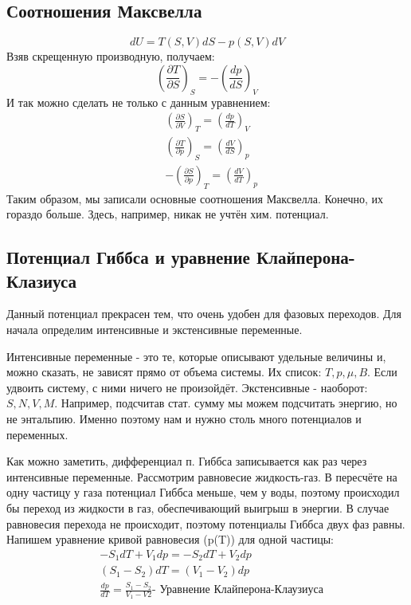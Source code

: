\documentclass[a4paper, 12pt]{article}
\begin{document}
	\subsection{Соотношения Максвелла}
	\begin{equation*}
		dU = T(S,V)dS - p(S,V)dV
	\end{equation*}
	Взяв скрещенную производную, получаем:
	\begin{equation*}
		(\frac{\partial T}{\partial S})_{S} = -(\frac{dp}{dS})_{V}
	\end{equation*}
	И так можно сделать не только с данным уравнением:
	\begin{equation*}
		\begin{aligned}
			& (\frac{\partial S}{\partial V})_{T} = (\frac{dp}{dT})_{V}  \\
			& (\frac{\partial T}{\partial p})_{S} = (\frac{dV}{dS})_{p}  \\
			& -(\frac{\partial S}{\partial p})_{T} = (\frac{dV}{dT})_{p} 
		\end{aligned}
	\end{equation*}
	Таким образом, мы записали основные соотношения Максвелла. Конечно, их гораздо больше. Здесь, например, никак не учтён хим. потенциал. 
	\subsection{Потенциал Гиббса и уравнение Клайперона- Клазиуса}
	Данный потенциал прекрасен тем, что очень удобен для фазовых переходов. Для начала определим интенсивные и экстенсивные переменные.
	
	Интенсивные переменные - это те, которые  описывают удельные величины и, можно сказать, не зависят прямо от объема системы. Их список: $T, p, \mu, B$. Если удвоить систему, с ними ничего не произойдёт. Экстенсивные - наоборот: $S,N,V,M$. Например, подсчитав стат. сумму мы можем подсчитать энергию, но не энтальпию. Именно поэтому нам и нужно столь много потенциалов и переменных.
	
	Как можно заметить, дифференциал п. Гиббса записывается как раз через интенсивные переменные. Рассмотрим равновесие жидкость-газ. В пересчёте на одну частицу у газа потенциал Гиббса меньше, чем у воды, поэтому происходил бы переход из жидкости в газ, обеспечивающий выигрыш в энергии. В случае равновесия перехода не происходит, поэтому потенциалы Гиббса двух фаз равны. Напишем уравнение кривой равновесия (p(T)) для одной частицы:
	\begin{equation*}
		\begin{aligned}
			& -S_{1} dT + V_{1}dp = -S_{2} dT + V_{2} dp                                                                         \\
			& (S_{1}-S_{2})dT=(V_{1}-V_{2})dp                                                                                    \\
			& \frac{dp}{dT} = \frac{S_{1}-S_{2}}{V_{1}-V{2}} \text{- Уравнение Клайперона-Клаузиуса} 
		\end{aligned}
	\end{equation*}
\end{document}
